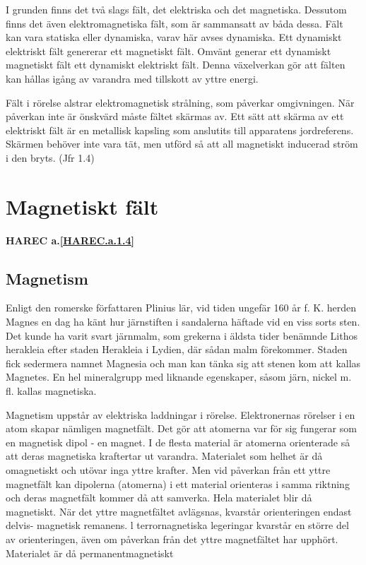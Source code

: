 I grunden finns det två slags fält, det elektriska och det magnetiska. Dessutom finns det
även elektromagnetiska fält, som är sammansatt av båda dessa. Fält kan vara statiska
eller dynamiska, varav här avses dynamiska. Ett dynamiskt elektriskt fält genererar ett
magnetiskt fält. Omvänt generar ett dynamiskt magnetiskt fält ett dynamiskt elektriskt
fält. Denna växelverkan gör att fälten kan hållas igång av varandra med tillskott av
yttre energi.

Fält i rörelse alstrar elektromagnetisk strålning, som påverkar omgivningen. När
påverkan inte är önskvärd måste fältet skärmas av. Ett sätt att skärma av ett elektriskt
fält är en metallisk kapsling som anslutits till apparatens jordreferens. Skärmen behöver
inte vara tät, men utförd så att all magnetiskt inducerad ström i den bryts. (Jfr 1.4)

\cleardoublepage

\section{Magnetiskt fält}
\textbf{HAREC a.\ref{HAREC.a.1.4}\label{myHAREC.a.1.4}}

\subsection{Magnetism}

Enligt den romerske författaren Plinius lär, vid tiden ungefär 160 år f. K. herden Magnes
en dag ha känt hur järnstiften i sandalerna häftade vid en viss sorts sten. Det kunde ha
varit svart järnmalm, som grekerna i äldsta tider benämnde Lithos herakleia efter staden
Herakleia i Lydien, där sådan malm förekommer. Staden fick sedermera namnet Magnesia och
man kan tänka sig att stenen kom att kallas Magnetes. En hel mineralgrupp med liknande
egenskaper, såsom järn, nickel m. fl. kallas magnetiska.

Magnetism uppstår av elektriska laddningar i rörelse. Elektronernas rörelser i en atom
skapar nämligen magnetfält. Det gör att atomerna var för sig fungerar som en magnetisk
dipol - en magnet. I de flesta material är atomerna orienterade så att deras magnetiska
kraftertar ut varandra. Materialet som helhet är då omagnetiskt och utövar inga yttre
krafter. Men vid påverkan från ett yttre magnetfält kan dipolerna (atomerna) i ett
material orienteras i samma riktning och deras magnetfält kommer då att
samverka. Hela materialet blir då magnetiskt. När det yttre magnetfältet avlägsnas,
kvarstår orienteringen endast delvis- magnetisk remanens. l terrornagnetiska legeringar
kvarstår en större del av orienteringen, även om påverkan från det yttre magnetfältet har
upphört. Materialet är då permanentmagnetiskt

